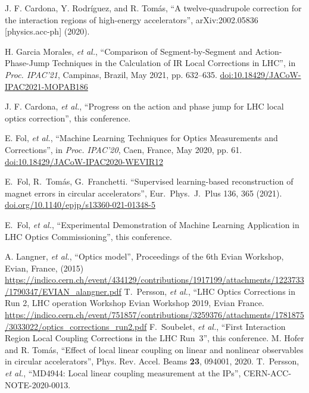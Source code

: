 \documentclass{cernatsnote}
\begin{document}
\begin{thebibliography}{99}
 J. F.  Cardona, Y. Rodr\'iguez, and R. Tom\'as, ``A twelve-quadrupole correction for the interaction regions of high-energy accelerators'',  arXiv:2002.05836 [physics.acc-ph] (2020).

   H. Garcia Morales, {\it et al.},
   \textquotedblleft{Comparison of Segment-by-Segment and Action-Phase-Jump Techniques in the Calculation of IR Local Corrections in LHC}\textquotedblright,
   in \emph{Proc. IPAC’21}, Campinas, Brazil, May 2021, pp. 632--635.
   \url{doi:10.18429/JACoW-IPAC2021-MOPAB186}  

 J. F. Cardona, {\it et al.}, ``Progress on the action and phase jump for LHC local optics correction'', this conference.


  E. Fol, {\it et al.},
   \textquotedblleft{Machine Learning Techniques for Optics Measurements and Corrections}\textquotedblright,
   in \emph{Proc. IPAC’20}, Caen, France, May 2020, pp. 61.
   \url{doi:10.18429/JACoW-IPAC2020-WEVIR12} 

 E.~Fol, R.~Tom\'as,  G.~Franchetti. ``Supervised learning-based reconstruction of magnet errors in circular accelerators'', Eur.~Phys.~J.~Plus 136, 365 (2021). \url{doi.org/10.1140/epjp/s13360-021-01348-5}

 E.~Fol, {\it et al.}, ``Experimental Demonstration of Machine Learning Application in LHC Optics Commissioning'', this conference.


 A. Langner, {\it et al.}, “Optics model”, Proceedings of the 6th Evian Workshop,
Evian, France, (2015) \url{https://indico.cern.ch/event/434129/contributions/1917199/attachments/1223733/1790347/EVIAN_alangner.pdf}
%
T.~Persson, {\it et al.}, ``LHC Optics Corrections in Run 2, LHC operation Workshop Evian Workshop 2019, Evian France.
\url{https://indico.cern.ch/event/751857/contributions/3259376/attachments/1781875/3033022/optics_corrections_run2.pdf}
%
 F.~Soubelet, {\it et al.}, ``First Interaction Region Local Coupling Corrections in the LHC Run~3'', this conference.
%
 M. Hofer and R. Tom\'as, ``Effect of local linear coupling on linear and nonlinear observables in circular accelerators'',
Phys. Rev. Accel. Beams {\bf23}, 094001, 2020.
%
 T.~Persson, {\it et al.}, ``MD4944: Local linear coupling measurement at the IPs'', CERN-ACC-NOTE-2020-0013.


\end{thebibliography}
\end{document}
